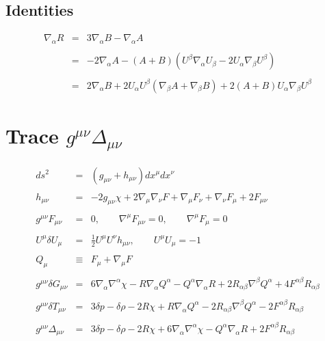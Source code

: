 \documentclass[10pt,letterpaper]{article}
\numberwithin{equation}{section}
\begin{document}
\subsection{Identities}
\begin{eqnarray}
\nabla_\alpha R &=& 3\nabla_\alpha B - \nabla_\alpha A
\\ \nonumber\\
&=& -2\nabla_\alpha A - (A+B)(U^\beta \nabla_\alpha U_\beta -2U_\alpha\nabla_\beta U^\beta)
\\ \nonumber\\
&=& 2\nabla_\alpha B + 2U_\alpha U^\beta (\nabla_\beta A + \nabla_\beta B)+2(A+B)U_\alpha \nabla_\beta U^\beta
\end{eqnarray}
%
%
\section{Trace $g^{\mu\nu}\Delta_{\mu\nu}$}
%
%
\begin{eqnarray}
ds^2 &=& ( g_{\mu\nu}+ h_{\mu\nu}) dx^\mu dx^\nu
\\ \nonumber\\
h_{\mu\nu} &=& -2 g_{\mu\nu}\chi + 2\nabla_\mu \nabla_\nu F +\nabla_\mu F_\nu +\nabla_\nu F_\mu+ 2F_{\mu\nu}
\label{svt}
\\ \nonumber\\
g^{\mu\nu} F_{\mu\nu} &=&0,\qquad \nabla^\mu F_{\mu\nu} = 0,\qquad \nabla^\mu F_\mu=0 
\\ \nonumber\\
U^\mu \delta U_\mu &=& \tfrac12 U^\mu U^\nu h_{\mu\nu},\qquad U^\mu U_\mu = -1
\\ \nonumber\\
Q_\mu  &\equiv& F_\mu + \nabla_\mu F
\\ \nonumber\\
g^{\mu\nu}\delta G_{\mu\nu}&=& 6 \nabla_{\alpha }\nabla^{\alpha }\chi - R \nabla_{\alpha }Q^{\alpha } -  Q^{\alpha } \nabla_{\alpha }R + 2 R_{\alpha \beta } \nabla^{\beta }Q^{\alpha }+4 F^{\alpha \beta } R_{\alpha \beta }
\\  \nonumber\\ 
g^{\mu\nu}\delta T_{\mu\nu}&=& 3 \delta p -  \delta \rho - 2 R \chi +R \nabla_{\alpha }Q^{\alpha } - 2 R_{\alpha \beta } \nabla^{\beta }Q^{\alpha }-2 F^{\alpha \beta } R_{\alpha \beta }
\\ \nonumber\\
g^{\mu\nu}\Delta_{\mu\nu}&=& 3 \delta p -  \delta \rho - 2 R \chi + 6 \nabla_{\alpha }\nabla^{\alpha }\chi - Q^{\alpha } \nabla_{\alpha }R+2 F^{\alpha \beta } R_{\alpha \beta }
\end{eqnarray}
%
%
\end{document}
